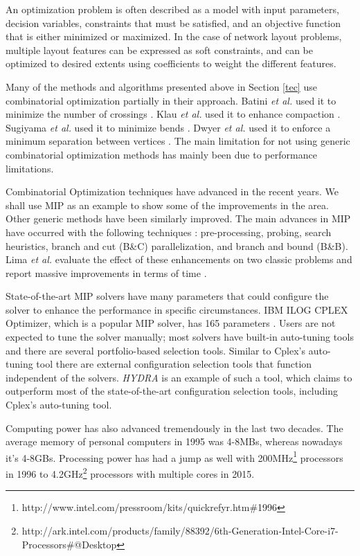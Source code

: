 \documentclass[a4paper,11pt,phdthesis,singlespace,twoside]{cssethesis}
\begin{document}
An optimization problem is often described as a model with input parameters, decision variables, constraints that must be satisfied, and an objective function that is either minimized or maximized. In the case of network layout problems, multiple layout features can be expressed as soft constraints, and can be optimized to desired extents using coefficients to weight the different features.

Many of the methods and algorithms presented above in Section \ref{tec} use combinatorial optimization partially in their approach. Batini \emph{et al.} used it to minimize the number of crossings \cite{batini1986layout}. Klau \emph{et al.} used it to enhance compaction \cite{klau99}. Sugiyama \emph{et al.} used it to minimize bends \cite{sugiyama1981methods}. Dwyer \emph{et al.} used it to enforce a minimum separation between vertices \cite{dwyer2006ipsep}. The main limitation for not using generic combinatorial optimization methods has mainly been due to performance limitations.

Combinatorial Optimization techniques have advanced in the recent years. We shall use MIP as an example to show some of the improvements in the area. Other generic methods have been similarly improved. The main advances in MIP have occurred with the following techniques \cite{lima2011computational}: pre-processing,  probing, search heuristics, branch and cut (B\&C) parallelization, and branch and bound (B\&B). Lima \emph{et al.} evaluate the effect of these enhancements on two classic problems and report massive improvements in terms of time \cite{lima2011computational}.

State-of-the-art MIP solvers have many parameters that could configure the solver to enhance the performance in specific circumstances. IBM ILOG CPLEX Optimizer, which is a popular MIP solver, has 165 parameters \cite{cplex}. Users are not expected to tune the solver manually; most solvers have built-in auto-tuning tools and there are several portfolio-based selection tools. Similar to Cplex's auto-tuning tool there are external configuration selection tools that function independent of the solvers. \emph{HYDRA} \cite{xu2011hydra} is an example of such a tool, which claims to outperform most of the state-of-the-art configuration selection tools, including Cplex's auto-tuning tool.

Computing power has also advanced tremendously in the last two decades. The average memory of personal computers in 1995 was 4-8MBs, whereas nowadays it's 4-8GBs. Processing power has had a jump as well with 200MHz\footnote{http://www.intel.com/pressroom/kits/quickrefyr.htm\#1996} processors in 1996 to 4.2GHz\footnote{http://ark.intel.com/products/family/88392/6th-Generation-Intel-Core-i7-Processors\#@Desktop} processors with multiple cores in 2015.
\end{document}
